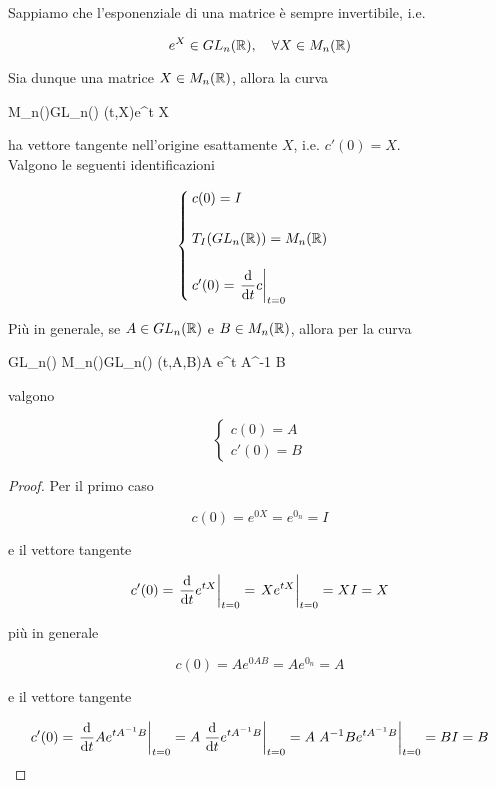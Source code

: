 \begin{corollary}
	Sappiamo che l'esponenziale di una matrice è sempre invertibile, i.e.
	
	\begin{equation}
		e^{X} \in GL_{n}(\R) \qcomma \forall X \in M_{n}(\R)
	\end{equation}

	Sia dunque una matrice $ X \in M_{n}(\mathbb{R}) $, allora la curva
	
		{\R \times M_{n}(\R)}{GL_{n}(\R)}
		{(t,X)}{e^{t X}}
	
	ha vettore tangente nell'origine esattamente $ X $, i.e. $ c'(0) = X $.\\
	Valgono le seguenti identificazioni
	
	\begin{equation}
		\begin{cases}
			c(0) = I \\\\
			T_{I}(GL_{n}(\R)) = M_{n}(\R) \\\\
			c'(0) = \eval{ \ddv{t} c }_{t=0}
		\end{cases}
	\end{equation}

	Più in generale, se $ A \in GL_{n}(\mathbb{R}) $ e $ B \in M_{n}(\mathbb{R}) $, allora per la curva
	
		{\R \times GL_{n}(\R) \times M_{n}(\R)}{GL_{n}(\R)}
		{(t,A,B)}{A e^{t A^{-1} B}}
	
	valgono
	
	\begin{equation}
		\begin{cases}
			c(0) = A \\
			c'(0) = B
		\end{cases}
	\end{equation}
\end{corollary}

\begin{proof}
	Per il primo caso
	
	\begin{equation}
		c(0) = e^{0 X} = e^{0_{n}} = I
	\end{equation}

	e il vettore tangente
	
	\begin{equation}
		c'(0) = \eval{ \dv{t} e^{t X} }_{t=0} %
		= \eval{ X e^{t X} }_{t=0} %
		= X I %
		= X
	\end{equation}

	più in generale
	
	\begin{equation}
		c(0) = A e^{0 A B} = A e^{0_{n}} = A
	\end{equation}

	e il vettore tangente
	
	\begin{equation}
		c'(0) = \eval{ \dv{t} A e^{t A^{-1} B} }_{t=0} %
		= A \eval{ \dv{t} e^{t A^{-1} B} }_{t=0} %
		= A \eval{ A^{-1} B e^{t A^{-1} B} }_{t=0} %
		= B I %
		= B
	\end{equation}
\end{proof}

